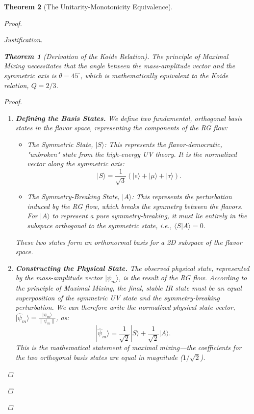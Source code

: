 \documentclass[11pt, letterpaper]{report}
\theoremstyle{plain} %
\newtheorem{theorem}{Theorem}[chapter]
\theoremstyle{definition} %
\theoremstyle{remark} %
\begin{document}
\begin{theorem}[The Unitarity-Monotonicity Equivalence]
\begin{proof}
\begin{proof}[Justification]
\begin{theorem}[Derivation of the Koide Relation]
\label{thm:derive_koide_from_mixing}
The principle of Maximal Mixing necessitates that the angle between the mass-amplitude vector and the symmetric axis is $\theta = 45^\circ$, which is mathematically equivalent to the Koide relation, $Q=2/3$.
\end{theorem}
\begin{proof}
\begin{enumerate}
    \item \textbf{Defining the Basis States.} We define two fundamental, orthogonal basis states in the flavor space, representing the components of the RG flow:
    \begin{itemize}
        \item The Symmetric State, $|S\rangle$: This represents the flavor-democratic, "unbroken" state from the high-energy UV theory. It is the normalized vector along the symmetric axis:
        $$ |S\rangle = \frac{1}{\sqrt{3}}(|e\rangle + |\mu\rangle + |\tau\rangle). $$
        \item The Symmetry-Breaking State, $|A\rangle$: This represents the perturbation induced by the RG flow, which breaks the symmetry between the flavors. For $|A\rangle$ to represent a pure symmetry-breaking, it must lie entirely in the subspace orthogonal to the symmetric state, i.e., $\langle S | A \rangle = 0$.
    \end{itemize}
    These two states form an orthonormal basis for a 2D subspace of the flavor space.

    \item \textbf{Constructing the Physical State.} The observed physical state, represented by the mass-amplitude vector $|\psi_m\rangle$, is the result of the RG flow. According to the principle of Maximal Mixing, the final, stable IR state must be an equal superposition of the symmetric UV state and the symmetry-breaking perturbation. We can therefore write the normalized physical state vector, $|\hat{\psi}_m\rangle = \frac{|\psi_m\rangle}{\|\psi_m\|}$, as:
    \begin{equation}
        |\hat{\psi}_m\rangle = \frac{1}{\sqrt{2}}|S\rangle + \frac{1}{\sqrt{2}}|A\rangle.
    \end{equation}
    This is the mathematical statement of maximal mixing—the coefficients for the two orthogonal basis states are equal in magnitude ($1/\sqrt{2}$).


\end{enumerate}
\end{proof}
\end{proof}
\end{proof}
\end{theorem}
\end{document}
